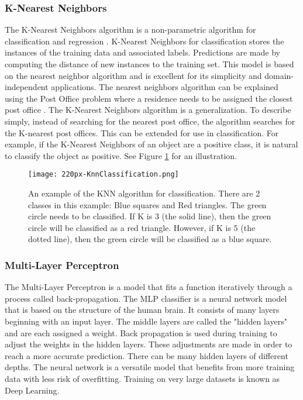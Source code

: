 \subsubsection{K-Nearest Neighbors}
The K-Nearest Neighbors algorithm is a non-parametric algorithm for classification and regression \cite{altman1992introduction}.
K-Nearest Neighbors for classification stores the instances of the training data and associated labels.
Predictions are made by computing the distance of new instances to the training set.
This model is based on the nearest neighbor algorithm and is excellent for its simplicity and domain-independent applications.
The nearest neighbors algorithm can be explained using the Post Office problem where a residence needs to be assigned the closest post office \cite{knuth1997art}.
The K-Nearest Neighbors algorithm is a generalization.
To describe simply, instead of searching for the nearest post office, the algorithm searches for the K-nearest post offices.
This can be extended for use in classification.
For example, if the K-Nearest Neighbors of an object are a positive class, it is natural to classify the object as positive.
See Figure \ref{fig:knn} for an illustration.

\begin{figure}[htp]
    \centering
    \texttt{[image: 220px-KnnClassification.png]}
    \caption{An example of the KNN algorithm for classification.
    There are 2 classes in this example: Blue squares and Red triangles.
    The green circle needs to be classified.
    If K is 3 (the solid line), then the green circle will be classified as a red triangle.
    However, if K is 5 (the dotted line), then the green circle will be classified as a blue square.}
    \label{fig:knn}
\end{figure} 

\medskip

\subsubsection{Multi-Layer Perceptron}
The Multi-Layer Perceptron is a model that fits a function iteratively through a process called back-propagation.
The MLP classifier is a neural network model that is based on the structure of the human brain.
It consists of many layers beginning with an input layer.
The middle layers are called the "hidden layers" and are each assigned a weight.
Back propagation is used during training to adjust the weights in the hidden layers.
These adjustments are made in order to reach a more accurate prediction.
There can be many hidden layers of different depths.
The neural network is a versatile model that benefits from more training data with less risk of overfitting.
Training on very large datasets is known as Deep Learning.

